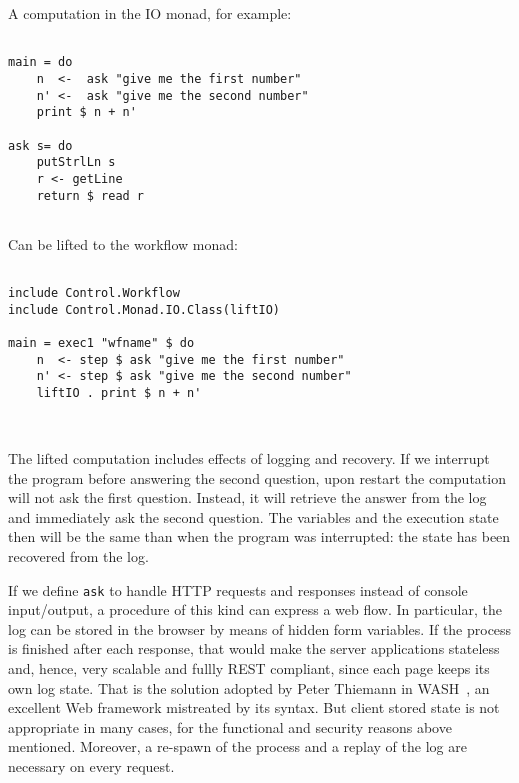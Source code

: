 \documentclass{tmr}
\begin{document}
 A computation in the IO monad, for example: 
 
{\tt 
 
\begin{verbatim} 
 
main = do 
    n  <-  ask "give me the first number" 
    n' <-  ask "give me the second number" 
    print $ n + n' 
 
ask s= do 
    putStrlLn s 
    r <- getLine 
    return $ read r 
 
\end{verbatim} 
 
} 
 
Can be lifted to the workflow monad: 
 
{\tt 
 
\begin{verbatim} 
 
include Control.Workflow 
include Control.Monad.IO.Class(liftIO) 
 
main = exec1 "wfname" $ do 
    n  <- step $ ask "give me the first number" 
    n' <- step $ ask "give me the second number" 
    liftIO . print $ n + n' 
 
 
\end{verbatim} 
 
} 
 
The lifted computation includes effects of logging and recovery. If we interrupt the program before answering the second question, upon restart the computation will not ask the first question. Instead, it will retrieve the answer from the log and immediately ask the second question. The variables and the execution state then will be the same than when the program was interrupted: the state has been recovered from the log. 
 
If we define {\tt ask} to handle HTTP requests and responses instead of console input/output, a procedure of this kind can express a web flow. 
In particular, the log can be stored in the browser by means of hidden form 
variables. If the process is finished after each response, that would make the server applications stateless and, hence, very scalable and fullly REST compliant, since each page keeps its own log state. That is the solution adopted by Peter Thiemann in WASH~\cite{auth:wash}, an excellent Web framework mistreated by its syntax. But client stored state is not appropriate in many cases, for the functional and security reasons above mentioned. Moreover, a re-spawn of the process and a replay of the log are necessary on every request. 
 
\end{document}
